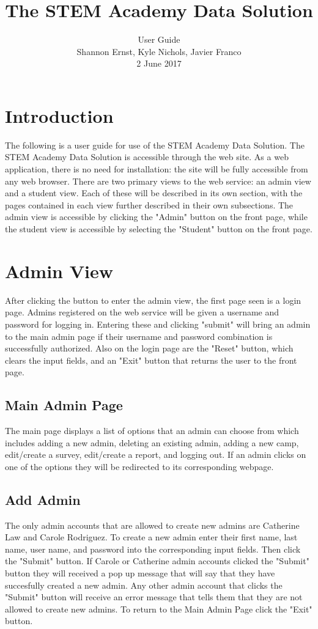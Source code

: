 \documentclass[letterpaper,10pt,serif, draftclsnofoot,onecolumn, compsoc, titlepage]{IEEEtran}
\title{The STEM Academy Data Solution}
\author{User Guide \\ Shannon Ernst, Kyle Nichols, Javier Franco\\ 2 June 2017}
\begin{document}
\maketitle

\newpage
\tableofcontents
\newpage

\section{Introduction}
The following is a user guide for use of the STEM Academy Data Solution.
The STEM Academy Data Solution is accessible through the web site. %
As a web application, there is no need for installation: the site will be fully accessible from any web browser. 
There are two primary views to the web service: an admin view and a student view.
Each of these will be described in its own section, with the pages contained in each view further described in their own subsections.
The admin view is accessible by clicking the "Admin" button on the front page, while the student view is
 accessible by selecting the "Student" button on the front page.

\section{Admin View}
After clicking the button to enter the admin view, the first page seen is a login page.
Admins registered on the web service will be given a username and password for logging in.
Entering these and clicking "submit" will bring an admin to the main admin page if their username
 and password combination is successfully authorized. Also on the login page are the "Reset" button,
 which clears the input fields, and an "Exit" button that returns the user to the front page.
\subsection{Main Admin Page}
The main page displays a list of options that an admin can choose from which includes adding a new admin, deleting an existing admin, adding a new camp, edit/create a survey, edit/create a report, and logging out. If an admin clicks on one of the options they will be redirected to its corresponding webpage. 
\subsection{Add Admin}
The only admin accounts that are allowed to create new admins are Catherine Law and Carole Rodriguez. To create a new admin enter their first name, last name, user name, and password into the corresponding input fields. Then click the "Submit" button. If Carole or Catherine admin accounts clicked the "Submit" button they will received a pop up message that will say that they have succesfully created a new admin. Any other admin account that clicks the "Submit" button will receive an error message that tells them that they are not allowed to create new admins. To return to the Main Admin Page click the "Exit" button. 
\end{document}
